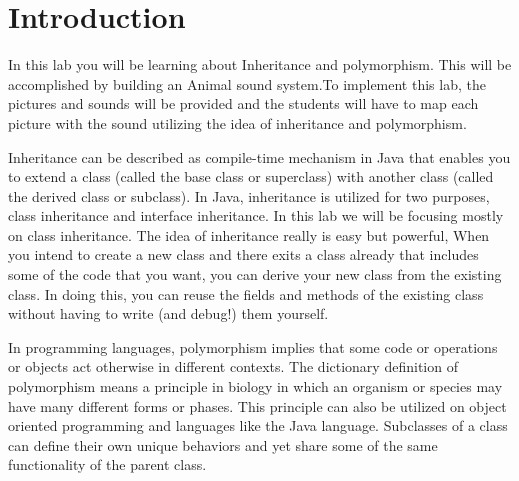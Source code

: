 \section{Introduction}

In this lab you will be learning about Inheritance and polymorphism. This will be accomplished by building an Animal sound system.To implement this lab, the pictures and sounds will be provided and the students will have to map each picture with the sound utilizing the idea of inheritance and polymorphism. 

Inheritance can be described as compile-time mechanism in Java that enables you to extend a class (called the base class or superclass) with another class (called the derived class or subclass). In Java, inheritance is utilized for two purposes, class inheritance and interface inheritance. In this lab we will be focusing mostly on class inheritance. The idea of inheritance really is easy but powerful, When you intend to create a new class and there exits a class already that includes some of the code that you want, you can derive your new class from the existing class. In doing this, you can reuse the fields and methods of the existing class without having to write (and debug!) them yourself. 

In programming languages, polymorphism implies that some code or operations or objects act otherwise in different contexts. The dictionary definition of polymorphism means a principle in biology in which an organism or species may have many different forms or phases. This principle can also be utilized on object oriented programming and languages like the Java language. Subclasses of a class can define their own unique behaviors and yet share some of the same functionality of the parent class.


